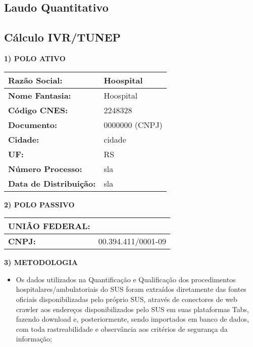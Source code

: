 \documentclass{article}
\begin{document}
      
      \pagestyle{empty}
      
      \begin{landscape}
          
          \section*{Laudo Quantitativo}
          \subsection*{Cálculo IVR/TUNEP}

    \textbf{1) POLO ATIVO}

    \begin{tabular}{l l}
    \hline
    \textbf{Razão Social:} & Hoospital \\
    \hline
    \textbf{Nome Fantasia:} & Hoospital \\
    \hline
    \textbf{Código CNES:} & 2248328 \\
    \hline
    \textbf{Documento:} & 0000000 (CNPJ) \\
    \hline
    \textbf{Cidade:} & cidade \\
    \hline
    \textbf{UF:} & RS \\
    \hline
    \textbf{Número Processo:} & sla \\
    \hline
    \textbf{Data de Distribuição:} & sla \\
    \hline
    \end{tabular}

    \vspace{10mm}

    \textbf{2) POLO PASSIVO}

    \begin{tabular}{l l}
    \hline
    \textbf{UNIÃO FEDERAL:} & \\
    \hline
    \textbf{CNPJ:} & 00.394.411/0001-09 \\
    \hline
    \end{tabular}

    \vspace{10mm}

    \textbf{3) METODOLOGIA}

    \begin{itemize}
    \item Os dados utilizados na Quantificação e Qualificação dos procedimentos hospitalares/ambulatoriais do SUS foram extraídos diretamente das fontes oficiais disponibilizadas pelo próprio SUS, através de conectores de web crawler aos endereços disponibilizados pelo SUS em suas plataformas Tabs, fazendo download e, posteriormente, sendo importados em banco de dados, com toda rastreabilidade e observância aos critérios de segurança da informação;


\end{itemize}
\end{landscape}
\end{document}
